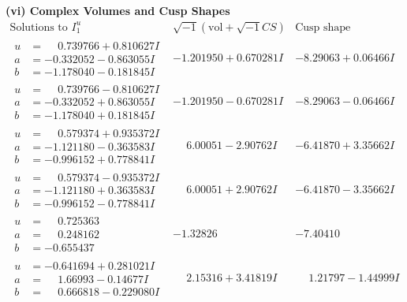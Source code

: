 \documentclass[1p]{elsarticle_modified}
\theoremstyle{definition}
\newcommand{\I}{\sqrt{-1}}
\begin{document}
\newpage\flushleft \textbf{(vi) Complex Volumes and Cusp Shapes}
$$\begin{array}{c|c|c}  
\text{Solutions to }I^u_{1}& \I (\text{vol} + \sqrt{-1}CS) & \text{Cusp shape}\\
 \hline 
\begin{aligned}
u &= \phantom{-}0.739766 + 0.810627 I \\
a &= -0.332052 - 0.863055 I \\
b &= -1.178040 - 0.181845 I\end{aligned}
 & -1.201950 + 0.670281 I & -8.29063 + 0.06466 I \\ \hline\begin{aligned}
u &= \phantom{-}0.739766 - 0.810627 I \\
a &= -0.332052 + 0.863055 I \\
b &= -1.178040 + 0.181845 I\end{aligned}
 & -1.201950 - 0.670281 I & -8.29063 - 0.06466 I \\ \hline\begin{aligned}
u &= \phantom{-}0.579374 + 0.935372 I \\
a &= -1.121180 - 0.363583 I \\
b &= -0.996152 + 0.778841 I\end{aligned}
 & \phantom{-}6.00051 - 2.90762 I & -6.41870 + 3.35662 I \\ \hline\begin{aligned}
u &= \phantom{-}0.579374 - 0.935372 I \\
a &= -1.121180 + 0.363583 I \\
b &= -0.996152 - 0.778841 I\end{aligned}
 & \phantom{-}6.00051 + 2.90762 I & -6.41870 - 3.35662 I \\ \hline\begin{aligned}
u &= \phantom{-}0.725363\phantom{ +0.000000I} \\
a &= \phantom{-}0.248162\phantom{ +0.000000I} \\
b &= -0.655437\phantom{ +0.000000I}\end{aligned}
 & -1.32826\phantom{ +0.000000I} & -7.40410\phantom{ +0.000000I} \\ \hline\begin{aligned}
u &= -0.641694 + 0.281021 I \\
a &= \phantom{-}1.66993 - 0.14677 I \\
b &= \phantom{-}0.666818 - 0.229080 I\end{aligned}
 & \phantom{-}2.15316 + 3.41819 I & \phantom{-}1.21797 - 1.44999 I \\ \hline\begin{aligned}

\end{aligned}
\end{array}$$
\end{document}
